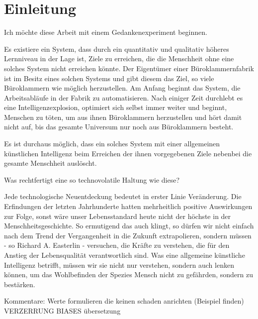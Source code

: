 \chapter{Einleitung}

Ich möchte diese Arbeit mit einem Gedankenexperiment beginnen.

Es existiere ein System, dass durch ein quantitativ und qualitativ höheres Lernniveau in der Lage ist, Ziele zu erreichen, die die Menschheit ohne eine solches System nicht erreichen könnte. Der Eigentümer einer Büroklammernfabrik ist im Besitz eines solchen Systems und gibt diesem das Ziel, so viele Büroklammern wie möglich herzustellen. Am Anfang beginnt das System, die Arbeitsabläufe in der Fabrik zu automatisieren. Nach einiger Zeit durchlebt es eine Intelligenzexplosion, optimiert sich selbst immer weiter und beginnt, Menschen zu töten, um aus ihnen Büroklammern herzustellen und hört damit nicht auf, bis das gesamte Universum nur noch aus Büroklammern besteht. 

Es ist durchaus möglich, dass ein solches System mit einer allgemeinen künstlichen Intelligenz beim Erreichen der ihnen vorgegebenen Ziele nebenbei die gesamte Menschheit auslöscht.

Was rechtfertigt eine so technovolatile Haltung wie diese?


Jede technologische Neuentdeckung bedeutet in erster Linie Veränderung. Die Erfindungen der letzten Jahrhunderte hatten mehrheitlich positive Auswirkungen zur Folge, sonst wäre unser Lebensstandard heute nicht der höchste in der Menschheitsgeschichte. So ermutigend das auch klingt, so dürfen wir nicht einfach nach dem Trend der Vergangenheit in die Zukunft extrapolieren, sondern müssen - so Richard A. Easterlin - versuchen, die Kräfte zu verstehen, die für den Anstieg der Lebensqualität verantwortlich sind.  Was eine allgemeine künstliche Intelligenz betrifft, müssen wir sie nicht nur verstehen, sondern auch lenken können, um das Wohlbefinden der Spezies Mensch nicht zu gefährden, sondern zu bestärken.

Kommentare:
Werte formulieren die keinen schaden anrichten (Beispiel finden)
VERZERRUNG BIASES übersetzung

